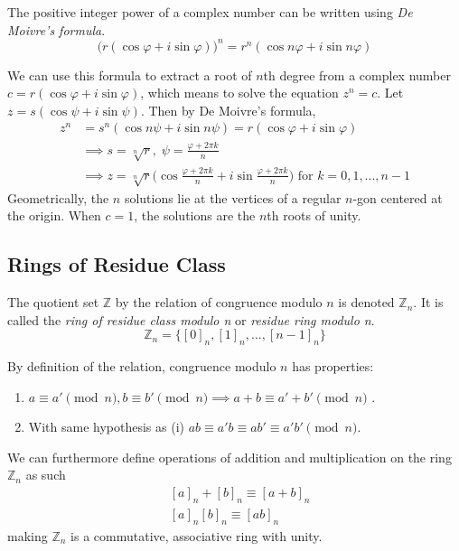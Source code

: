 \documentclass{article}
\begin{document}
      \begin{corollary}
        The positive integer power of a complex number can be written using \textit{De Moivre's formula}. 
        \begin{equation}
          \big(r(\cos{\varphi} + i \sin{\varphi})\big)^n = r^n (\cos{n \varphi} + i \sin{n \varphi})
        \end{equation}
      \end{corollary}

      We can use this formula to extract a root of $n$th degree from a complex number $c = r(\cos{\varphi} + i \sin{\varphi})$, which means to solve the equation $z^n = c$. Let $z = s (\cos{\psi} + i \sin{\psi})$. Then by De Moivre's formula, 
      \begin{align*}
        z^n & = s^n (\cos{n \psi} + i \sin{n \psi}) = r(\cos{\varphi} + i \sin{\varphi}) \\
        & \implies s = \sqrt[n]{r}, \; \psi = \frac{\varphi + 2\pi k}{n} \\
        & \implies z = \sqrt[n]{r} \bigg( \cos{\frac{\varphi + 2\pi k}{n}} + i \sin{\frac{\varphi + 2\pi k}{n}}\bigg) \text{ for } k = 0, 1, ..., n-1
      \end{align*}
      Geometrically, the $n$ solutions lie at the vertices of a regular $n$-gon centered at the origin. When $c = 1$, the solutions are the $n$th roots of unity.

  \subsection{Rings of Residue Class}

    \begin{definition}
      The quotient set $\mathbb{Z}$ by the relation of congruence modulo $n$ is denoted $\mathbb{Z}_{n}$. It is called the \textit{ring of residue class modulo n} or \textit{residue ring modulo n}. 
      \begin{equation}
        \mathbb{Z}_{n} = \{ [0]_{n}, [1]_{n}, ... , [n-1]_{n} \}
      \end{equation}
    \end{definition}

    By definition of the relation, congruence modulo $n$ has properties: 
    \begin{enumerate}
      \item $a \equiv a' \pmod{n}, b \equiv b' \pmod{n} \implies a + b \equiv a' + b' \pmod{n}$ . 
      \item With same hypothesis as (i) $a b \equiv a' b \equiv a b' \equiv a' b' \pmod{n}$. 
    \end{enumerate}
    We can furthermore define operations of addition and multiplication on the ring $\mathbb{Z}_{n}$ as such 
    \begin{align*}
      & [a]_{n} + [b]_{n} \equiv [a + b]_{n} \\
      & [a]_{n} [b]_{n} \equiv [ab]_{n}
    \end{align*}
    making $\mathbb{Z}_{n}$ is a commutative, associative ring with unity. 
\end{document}
